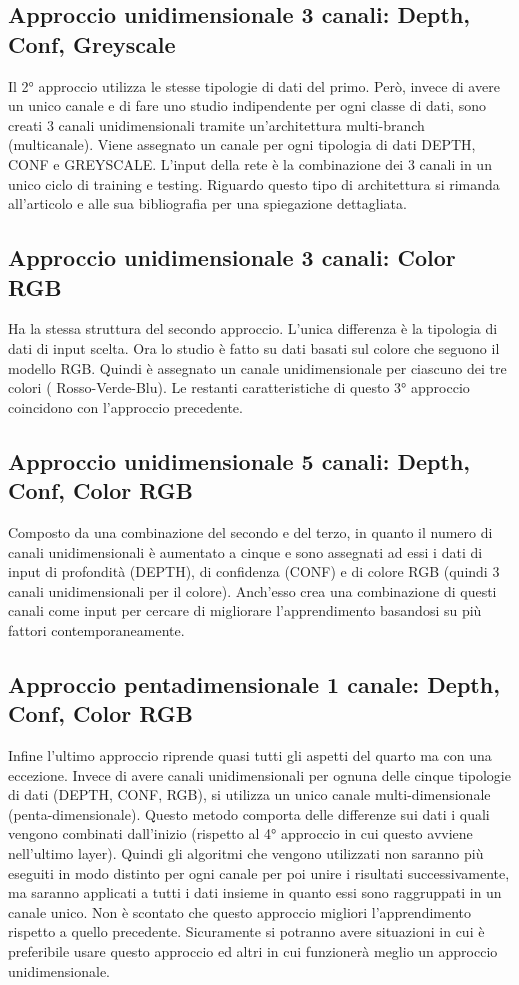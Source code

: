 \subsection{Approccio unidimensionale 3 canali: Depth, Conf, Greyscale}
Il 2° approccio utilizza le stesse tipologie di dati del primo. Però, invece di avere un unico canale e di fare uno studio indipendente per ogni classe di dati, sono creati 3 canali unidimensionali tramite un'architettura multi-branch (multicanale). Viene assegnato un canale per ogni tipologia di dati DEPTH, CONF e GREYSCALE. L'input della rete è la combinazione dei 3 canali in un unico ciclo di training e testing. Riguardo questo tipo di architettura si rimanda all'articolo \cite{Zhang2018DeepNN} e alle sua bibliografia per una spiegazione dettagliata.

\subsection{Approccio unidimensionale 3 canali: Color RGB}
Ha la stessa struttura del secondo approccio. L'unica differenza è la tipologia di dati di input scelta. Ora lo studio è fatto su dati basati sul colore che seguono il modello RGB. Quindi è assegnato un canale unidimensionale per ciascuno dei tre colori ( Rosso-Verde-Blu). Le restanti caratteristiche di questo 3° approccio coincidono con l'approccio precedente.

\subsection{Approccio unidimensionale 5 canali: Depth, Conf, Color RGB}
Composto da una combinazione del secondo e del terzo, in quanto il numero di canali unidimensionali è aumentato a cinque e sono assegnati ad essi i dati di input di profondità (DEPTH), di confidenza (CONF) e di colore RGB (quindi 3 canali unidimensionali per il colore). Anch'esso crea una combinazione di questi canali come input per cercare di migliorare l'apprendimento basandosi su più fattori contemporaneamente.

\subsection{Approccio pentadimensionale 1 canale: Depth, Conf, Color RGB}
Infine l'ultimo approccio riprende quasi tutti gli aspetti del quarto ma con una eccezione. Invece di avere canali unidimensionali per ognuna delle cinque tipologie di dati (DEPTH, CONF, RGB), si utilizza un unico canale multi-dimensionale (penta-dimensionale). Questo metodo comporta delle differenze sui dati i quali vengono combinati dall'inizio (rispetto al 4° approccio in cui questo avviene nell'ultimo layer). Quindi gli algoritmi che vengono utilizzati non saranno più eseguiti in modo distinto per ogni canale per poi unire i risultati successivamente, ma saranno applicati a tutti i dati insieme in quanto essi sono raggruppati in un canale unico. Non è scontato che questo approccio migliori l'apprendimento rispetto a quello precedente. Sicuramente si potranno avere situazioni in cui è preferibile usare questo approccio ed altri in cui funzionerà meglio un approccio unidimensionale.\\

